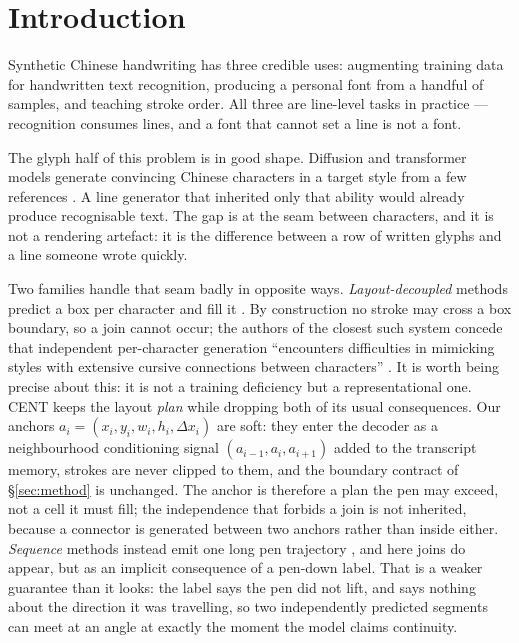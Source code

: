 \documentclass[conference]{IEEEtran}
\begin{document}
\section{Introduction}

Synthetic Chinese handwriting has three credible uses: augmenting training data for
handwritten text recognition, producing a personal font from a handful of samples, and
teaching stroke order. All three are line-level tasks in practice --- recognition consumes
lines, and a font that cannot set a line is not a font.

The glyph half of this problem is in good shape. Diffusion and transformer models generate
convincing Chinese characters in a target style from a few references
\cite{sdt,metascript,hisac,diffwriter,dp_font,scfont,stroke2font,lvgh}. A line generator that
inherited only that ability would already produce recognisable text. The gap is at the seam
between characters, and it is not a rendering artefact: it is the difference between a row
of written glyphs and a line someone wrote quickly.

Two families handle that seam badly in opposite ways. \emph{Layout-decoupled} methods predict
a box per character and fill it \cite{layout_glyph,hct_gan,yao2025}. By construction no stroke
may cross a box boundary, so a join cannot occur; the authors of the closest such system
concede that independent per-character generation ``encounters difficulties in mimicking
styles with extensive cursive connections between characters'' \cite{layout_glyph}. It is
worth being precise about this: it is not a training deficiency but a representational one.
CENT keeps the layout \emph{plan} while dropping both of its usual consequences. Our anchors
$a_i=(x_i,y_i,w_i,h_i,\Delta x_i)$ are soft: they enter the decoder as a neighbourhood
conditioning signal $(a_{i-1},a_i,a_{i+1})$ added to the transcript memory, strokes are never
clipped to them, and the boundary contract of \S\ref{sec:method} is unchanged. The anchor is
therefore a plan the pen may exceed, not a cell it must fill; the independence that forbids a
join is not inherited, because a connector is generated between two anchors rather than inside
either.
\emph{Sequence} methods instead emit one long pen trajectory \cite{graves2013,diffink,sdt},
and here joins do appear, but as an implicit consequence of a pen-down label. That is a
weaker guarantee than it looks: the label says the pen did not lift, and says nothing about
the direction it was travelling, so two independently predicted segments can meet at an
angle at exactly the moment the model claims continuity.
\end{document}
